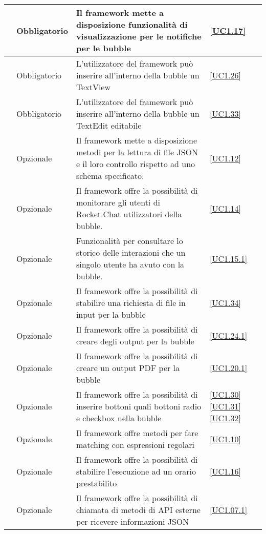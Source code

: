 \begin{longtable}{|P{1.5cm}|P{2.5cm}|P{6.5cm}|P{2.5cm}|}
	\hline \RequisitoObF\label{L16} & Obbligatorio & Il framework mette a disposizione funzionalità di visualizzazione per le notifiche per le bubble & \ref{UC1.17} \\
	\hline \RequisitoObF\label{L33} & Obbligatorio & L'utilizzatore del framework può inserire all'interno della bubble un TextView & \ref{UC1.26} \\
	\hline \RequisitoObF\label{L34} & Obbligatorio & L'utilizzatore del framework può inserire all'interno della bubble un TextEdit editabile & \ref{UC1.33} \\
	\hline \RequisitoOpF\label{L35} & Opzionale & Il framework mette a disposizione metodi per la lettura di file JSON e il loro controllo rispetto ad uno schema specificato. & \ref{UC1.12} \\
	\hline \RequisitoOpF\label{L36} & Opzionale & Il framework offre la possibilità di monitorare gli utenti di Rocket.Chat utilizzatori della bubble. & \ref{UC1.14} \\
	\hline \RequisitoOpF\label{L37} & Opzionale & Funzionalità per consultare lo storico delle interazioni che un singolo utente ha avuto con la bubble. & \ref{UC1.15.1} \\
	\hline \RequisitoOpF\label{L38} & Opzionale & Il framework offre la possibilità di stabilire una richiesta di file in input per la bubble & \ref{UC1.34} \\
	\hline \RequisitoOpF\label{L39} & Opzionale & Il framework offre la possibilità di creare degli output per la bubble & \ref{UC1.24.1} \\
	\hline \RequisitoOpF\label{L40} & Opzionale & Il framework offre la possibilità di creare un output PDF per la bubble & \ref{UC1.20.1} \\	
	\hline \RequisitoOpF\label{L41} & Opzionale & Il framework offre la possibilità di inserire bottoni quali bottoni radio e checkbox nella bubble & \ref{UC1.30} \linebreak \ref{UC1.31} \linebreak \ref{UC1.32} \\
	\hline \RequisitoOpF\label{L42} & Opzionale & Il framework offre metodi per fare matching con espressioni regolari
	 & \ref{UC1.10} \\
	\hline \RequisitoOpF\label{L43} & Opzionale & Il framework offre la possibilità di stabilire l'esecuzione ad un orario prestabilito & \ref{UC1.16} \\
	\hline \RequisitoOpF\label{L44} & Opzionale & Il framework offre la possibilità di chiamata di metodi di API esterne per ricevere informazioni JSON & \ref{UC1.07.1} \\

\end{longtable}
